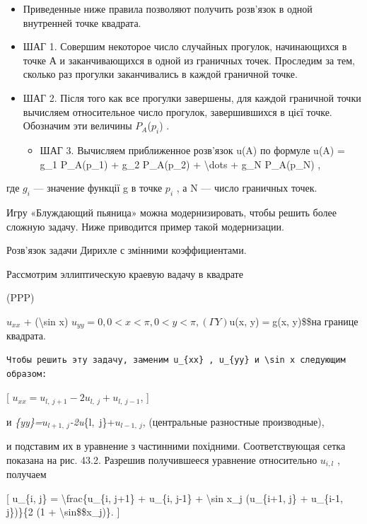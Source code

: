 \documentclass[
]{article}
\providecommand{\tightlist}{%
  \setlength{\itemsep}{0pt}\setlength{\parskip}{0pt}}
\begin{document}
{{{\begin{itemize}
\item
  Приведенные ниже правила позволяют получить розв'язок в одной
  внутренней точке квадрата.
\item
  ШАГ 1. Совершим некоторое число случайных прогулок, начинающихся в
  точке А и заканчивающихся в одной из граничных точек. Проследим за
  тем, сколько раз прогулки заканчивались в каждой граничной точке.
\item
  ШАГ 2. Після того как все прогулки завершены, для каждой граничной
  точки вычисляем относительное число прогулок, завершившихся в цієї
  точке. Обозначим эти величины \(P_A\)(\(p_i\)) .

  \begin{itemize}
  \tightlist
  \item
    ШАГ 3. Вычисляем приближенное розв'язок u(A) по формуле u(A) = g\_1
    P\_A(p\_1) + g\_2 P\_A(p\_2) + \textbackslash dots + g\_N P\_A(p\_N)
    ,
  \end{itemize}
\end{itemize}

где \(g_i\) --- значение функції g в точке \(p_i\) , а N --- число
граничных точек.

Игру «Блуждающий пьяница» можна модернизировать, чтобы решить более
сложную задачу. Ниже приводится пример такой модернизации.

Розв'язок задачи Дирихле с змінними коэффициентами.

Рассмотрим эллиптическую краевую вадачу в квадрате

(PPP)

\(u_{xx}\) + (\textbackslash sin x)
\(u_{yy} = 0 , 0 < x < \pi , 0 < y < \pi , (\Gamma Y)\)u(x, y)\(=\)g(x,
y)\$\$на границе квадрата.

\begin{verbatim}
Чтобы решить эту задачу, заменим u_{xx} , u_{yy} и \sin x следующим образом:
\end{verbatim}

{[} \(u_{xx}=u_{l,\ j+1}-2u_{l,\ j}+u_{l,\ j-1}\), {]}

и \emph{\{yy\}=\(u_{l+1,\ j}\)-2u}\{l,~j\}+\(u_{l-1,\ j}\), (центральные
разностные производные),

и подставим их в уравнение з частинними похідними. Соответствующая сетка
показана на рис. 43.2. Разрешив получившееся уравнение относительно
\(u_{i,l}\) , получаем

{[} u\_\{i, j\} = \textbackslash frac\{u\_\{i, j+1\} + u\_\{i, j-1\} +
\textbackslash sin x\_j (u\_\{i+1, j\} + u\_\{i-1, j\})\}\{2 (1 +
\textbackslash sin\$\$x\_j)\}. {]}

}}}
\end{document}
